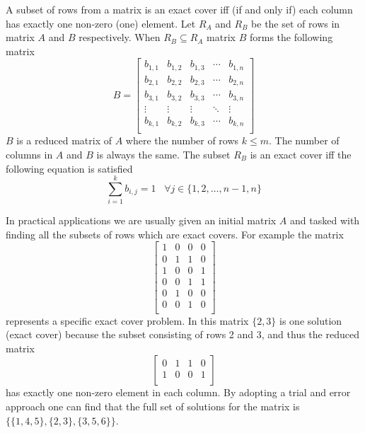 A subset of rows from a matrix is an exact cover iff (if and only if) each column has exactly one non-zero (one) element.
Let $R_A$ and $R_B$ be the set of rows in matrix $A$ and $B$ respectively.
When $R_B \subseteq R_A$ matrix $B$ forms the following matrix
\begin{equation}
	B =
	\left[
	\begin{array}{ccccc}
		b_{1,1} & b_{1,2} & b_{1,3} & \cdots & b_{1,n} \\
		b_{2,1} & b_{2,2} & b_{2,3} & \cdots & b_{2,n} \\
		b_{3,1} & b_{3,2} & b_{3,3} & \cdots & b_{3,n} \\
		\vdots  & \vdots  & \vdots  & \ddots & \vdots  \\
		b_{k,1} & b_{k,2} & b_{k,3} & \cdots & b_{k,n} \\
	\end{array}
	\right]
	\label{eq:cover_matrix}
\end{equation}
$B$ is a reduced matrix of $A$ where the number of rows $k \leq m$.
The number of columns in $A$ and $B$ is always the same.
The subset $R_B$ is an exact cover iff the following equation is satisfied
\[
	\sum_{i = 1}^{k} b_{i,j} = 1 \;\;\; \forall j \in \{ 1, 2, \ldots, n-1, n \}
\]

In practical applications we are usually given an initial matrix $A$ and tasked with finding all the subsets of rows which are exact covers.
For example the matrix
\begin{equation}
	\left[
	\begin{array}{cccc}
		1 & 0 & 0 & 0 \\
		0 & 1 & 1 & 0 \\
		1 & 0 & 0 & 1 \\
		0 & 0 & 1 & 1 \\
		0 & 1 & 0 & 0 \\
		0 & 0 & 1 & 0 \\
	\end{array}
	\right]
	\label{eq:cover_example}
\end{equation}
represents a specific exact cover problem.
In this matrix $\{ 2, 3 \}$ is one solution (exact cover) because the subset consisting of rows 2 and 3, and thus the reduced matrix
\[
\left[
\begin{array}{cccc}
	0 & 1 & 1 & 0 \\
	1 & 0 & 0 & 1 \\
\end{array}
\right]
\]
has exactly one non-zero element in each column.
By adopting a trial and error approach one can find that the full set of solutions for the matrix is $\{ \{1, 4, 5 \}, \{ 2, 3\}, \{ 3, 5, 6\} \}$.


